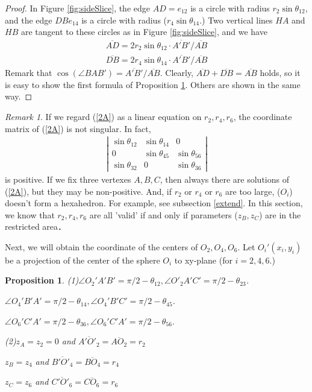 \documentclass[suppldata, dvipdfmx]{interact}
\theoremstyle{plain}%
\newtheorem{proposition}[theorem]{Proposition}
\theoremstyle{definition}
\theoremstyle{remark}
\newtheorem{remark}{Remark}
\theoremstyle{problemstyle}
\begin{document}
\begin{proof}
 In Figure \ref{fig:sideSlice}, the edge $AD = e_{12}$ is a circle with radius
 $r_2\sin\theta_{12}$, and the edge $DB e_{14}$ is a circle with radius
 ($r_4\sin\theta_{14}$.)
Two vertical lines $HA$ and $HB$ are tangent to these circles as in
 Figure \ref{fig:sideSlice},
 and we have 
 \begin{eqnarray*}
  \overline{AD} = 2 r_2 \sin\theta_{12} \cdot \overline{A'B'}/\overline{AB}\\
  \overline{DB} = 2 r_4 \sin\theta_{14} \cdot \overline{A'B'}/\overline{AB}
 \end{eqnarray*}
 Remark that $\cos(\angle BAB') =\overline{A'B'}/\overline{AB}.$ Clearly,
 $\overline{AD} + \overline{DB} = \overline{AB}$ holds, so it is easy to
 show the first formula of Proposition \ref{angles}. Others are shown in the same
 way.

\end{proof}

\begin{remark}
 If we regard (\ref{2A}) as a linear equation on $r_2, r_4, r_6$, the
 coordinate matrix of (\ref{2A}) is not singular. In fact,
 \begin{eqnarray*}
  \left| 
   \begin{array}{ccc}
    \sin\theta_{12} & \sin\theta_{14} & 0\\
    0               & \sin\theta_{45} & \sin\theta_{56}\\
    \sin\theta_{32} & 0               & \sin\theta_{36}
   \end{array}
  \right|
 \end{eqnarray*}
 is positive.
 If we fix three vertexes $A, B, C$, then always there are solutions of
 (\ref{2A}), but they may be non-positive. And, if $r_2$ or $r_4$ or $r_6$
 are too large, ($O_i$) doesn't form a hexahedron. For example, see
 subsection \ref{extend}. In this section, we know that $r_2, r_4, r_6$ are all
 'valid' if and only if parameters ($z_B, z_C$) are in the restricted area．

Next, we will obtain the coordinate of the centers of $O_2, O_4, O_6$.
Let $O_i'(x_i, y_i)$ be a projection of the center of the sphere $O_i$
 to xy-plane (for $i = 2, 4, 6$.)
\end{remark}

\begin{proposition}\label{angles}
 (1)$\angle O_2'A'B' = \pi/2 - \theta_{12}, \angle
 O'_2A'C'=\pi/2-\theta_{23}$.

  $\angle O_4'B'A' = \pi/2 - \theta_{14}, \angle O_4'B'C' = \pi/2 -
 \theta_{45}$.

 $\angle O_6'C'A' = \pi/2 - \theta_{36}, \angle O_6'C'A' = \pi/2 - \theta_{56}$.

 (2)$z_A = z_2 = 0$ and $\overline{A'O'_2} = \overline{AO_2} = r_2$

 $z_B = z_4$ and $\overline{B'O'_4} = \overline{BO_4} = r_4$

 $z_C = z_6$ and $\overline{C'O'_6} = \overline{CO_6} = r_6$
\end{proposition}
\end{document}
